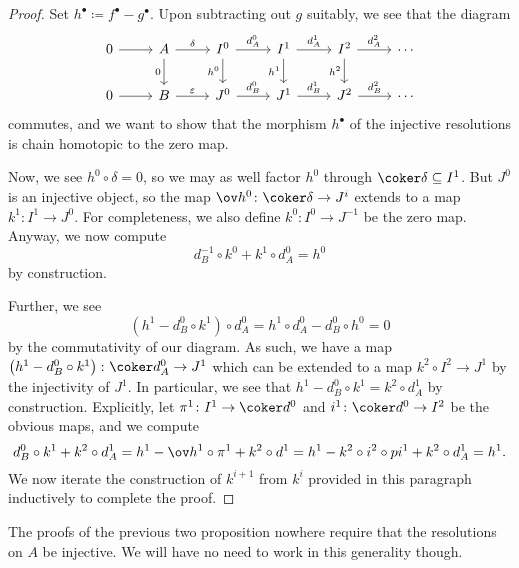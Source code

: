 \documentclass[../notes.tex]{subfiles}
\begin{document}
\begin{proof}
	Set $h^\bullet\coloneqq f^\bullet-g^\bullet$. Upon subtracting out $g$ suitably, we see that the diagram
	\[\begin{tikzcd}
		0 & A & {I^0} & {I^1} & {I^2} & \cdots \\
		0 & B & {J^0} & {J^1} & {J^2} & \cdots
		\arrow[from=1-1, to=1-2]
		\arrow["\delta", from=1-2, to=1-3]
		\arrow["\varepsilon", from=2-2, to=2-3]
		\arrow["{d^0_A}", from=1-3, to=1-4]
		\arrow["{d^1_A}", from=1-4, to=1-5]
		\arrow["{d^2_A}", from=1-5, to=1-6]
		\arrow["{d^0_B}", from=2-3, to=2-4]
		\arrow["{d^1_B}", from=2-4, to=2-5]
		\arrow["{d^2_B}", from=2-5, to=2-6]
		\arrow[from=2-1, to=2-2]
		\arrow["0"', from=1-2, to=2-2]
		\arrow["{h^0}"', from=1-3, to=2-3]
		\arrow["{h^1}"', from=1-4, to=2-4]
		\arrow["{h^2}"', from=1-5, to=2-5]
	\end{tikzcd}\]
	commutes, and we want to show that the morphism $h^\bullet$ of the injective resolutions is chain homotopic to the zero map. 
	
	Now, we see $h^0\circ\delta=0$, so we may as well factor $h^0$ through $\coker\delta\subseteq I^{1}$. But $J^0$ is an injective object, so the map $\ov h^0\colon\coker \delta\to J^i$ extends to a map $k^1\colon I^1\to J^0$. For completeness, we also define $k^0\colon I^0\to J^{-1}$ be the zero map. Anyway, we now compute
	\[d_B^{-1}\circ k^0+k^1\circ d_A^0=h^0\]
	by construction.
	
	Further, we see
	\[\left(h^1-d_B^0\circ k^1\right)\circ d_A^0=h^1\circ d_A^0-d_B^0\circ h^0=0\]
	by the commutativity of our diagram. As such, we have a map $\left(h^1-d_B^0\circ k^1\right)\colon\coker d_A^0\to J^1$ which can be extended to a map $k^2\circ I^2\to J^1$ by the injectivity of $J^1$. In particular, we see that $h^1-d_B^0\circ k^1=k^2\circ d_A^1$ by construction. Explicitly, let $\pi^1\colon I^1\to\coker d^0$ and $i^1\colon\coker d^0\to I^2$ be the obvious maps, and we compute
	\[d_B^0\circ k^1+k^2\circ d^1_A=h^1-\ov h^1\circ\pi^1+k^2\circ d^1=h^1-k^2\circ i^2\circ pi^1+k^2\circ d_A^1=h^1.\]
	We now iterate the construction of $k^{i+1}$ from $k^i$ provided in this paragraph inductively to complete the proof.
\end{proof}
\begin{remark}
	The proofs of the previous two proposition nowhere require that the resolutions on $A$ be injective. We will have no need to work in this generality though.
\end{remark}
\end{document}
